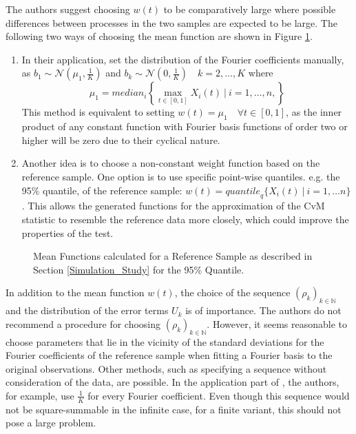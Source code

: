 \documentclass[12pt, a4paper]{article}
\theoremstyle{MAstyle} \newtheorem{assumption}{Assumption}[section]
\theoremstyle{MAstyle} \newtheorem{definition}{Definition}[section]
\theoremstyle{MAstyle} \newtheorem{theorem}{Theorem}[section]
\begin{document}
			The authors suggest choosing $w(t)$ to be comparatively large where possible differences between processes in the two samples are expected to be large. The following two ways of choosing the mean function are shown in Figure \ref{mean_functions}.
			
			\begin{enumerate}
				\item In their application, \cite{bugni_permutation_2021} set the distribution of the Fourier coefficients manually, as $b_1 \sim \mathcal{N}(\mu_1, \frac{1}{K})$ and $b_k \sim \mathcal{N}(0, \frac{1}{K}) \quad k = 2, \dots, K$ where 
				$$\mu_1 = \textit{median}_i \left\{\max_{t\in [0,1]} X_i(t) \ | \ i = 1, \dots, n, \right\}$$
				This method is equivalent to setting $w(t) = \mu_1 \quad \forall t \in [0,1]$, as the inner product of any constant function with Fourier basis functions of order two or higher will be zero due to their cyclical nature.
				\item Another idea is to choose a non-constant weight function based on the reference sample. One option is to use specific point-wise quantiles. e.g. the 95\% quantile, of the reference sample: $w(t) = \textit{quantile}_q \{X_i(t) \ | \ i = 1, \dots n\}$. This allows the generated functions for the approximation of the CvM statistic to resemble the reference data more closely, which could improve the properties of the test.
			\end{enumerate}
		
			\begin{figure}[H]
				\caption{Mean Functions calculated for a Reference Sample as described in Section \ref{Simulation_Study} for the 95\% Quantile.}
				\label{mean_functions}
			\end{figure}
			
			In addition to the mean function $w(t)$, the choice of the sequence $(\rho_k)_{k \in \mathbb{N}}$ and the distribution of the error terms $U_k$ is of importance.			
			The authors do not recommend a procedure for choosing $(\rho_k)_{k \in \mathbb{N}}$. However, it seems reasonable to choose parameters that lie in the vicinity of the standard deviations for the Fourier coefficients of the reference sample when fitting a Fourier basis to the original observations. Other methods, such as specifying a sequence without consideration of the data, are possible. In the application part of \cite{bugni_permutation_2021}, the authors, for example, use $\frac{1}{K}$ for every Fourier coefficient. Even though this sequence would not be square-summable in the infinite case, for a finite variant, this should not pose a large problem.
			
\end{document}
